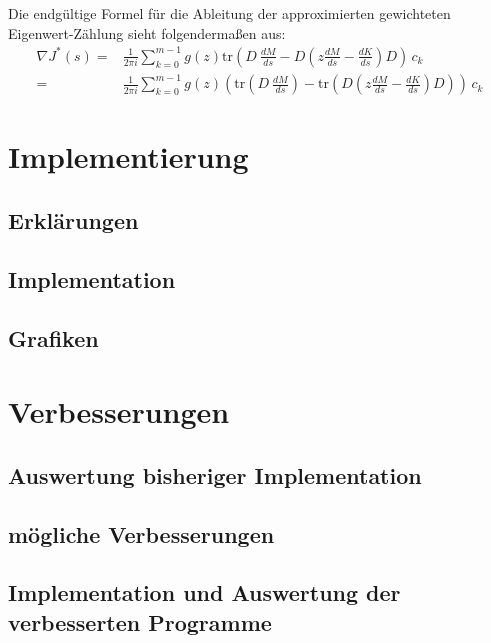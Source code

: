 \documentclass[a4paper,12pt]{report}
\newcommand{\klammer}[1]{\left(#1\right)}
\newcommand{\tr}{\text{tr}}
\newcommand{\1}{\mathds{1}}
\theoremstyle{plain} %
\theoremstyle{definition} %
\theoremstyle{remark}
\begin{document}
            Die endgültige Formel für die Ableitung der approximierten gewichteten Eigenwert-Zählung sieht folgendermaßen aus:
            \begin{align}
                  \label{eqn: vollständigeZielfunktion}
                  \nabla J^*(s) =& \frac 1 {2\pi i}\sum_{k=0}^{m-1} g(z) \tr\klammer{D \ \frac{dM}{ds} - D \klammer{z \frac{dM}{ds}-\frac{dK}{ds}} D}\,c_k\\
                  =& \frac 1 {2\pi i}\sum_{k=0}^{m-1} g(z) \klammer{\tr\klammer{D \ \frac{dM}{ds}} - \tr\klammer{D \klammer{z \frac{dM}{ds}-\frac{dK}{ds}} D}}\,c_k
            \end{align}
            
\chapter{Implementierung}
\label{sec: Programmieren}
      \section{Erklärungen}

      \section{Implementation}

      \section{Grafiken}

\chapter{Verbesserungen}
\label{sec: Verbesserungen}
      \section{Auswertung bisheriger Implementation}

      \section{mögliche Verbesserungen}

      \section{Implementation und Auswertung der verbesserten Programme}
\end{document}
